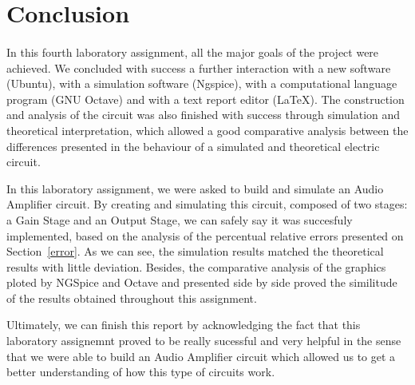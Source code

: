 \section{Conclusion}
\label{sec:conclusion}

\paragraph{}
In this fourth laboratory assignment, all the major goals of the project were achieved. We concluded with success a further interaction with a new software (Ubuntu), with a simulation software (Ngspice), with a computational language program (GNU Octave) and with a text report editor (LaTeX). The construction and analysis of the circuit was also finished with success through simulation and theoretical interpretation, which allowed a good comparative analysis between the differences presented in the behaviour of a simulated and theoretical electric circuit. 

In this laboratory assignment, we were asked to build and simulate an Audio Amplifier circuit. By creating and simulating this circuit, composed of two stages: a Gain Stage and an Output Stage, we can safely say it was succesfuly implemented, based on the analysis of the percentual relative errors presented on Section~\ref{error}. As we can see, the simulation results matched the theoretical results with little deviation. Besides, the comparative analysis of the graphics ploted by NGSpice and Octave and presented side by side proved the similitude of the results obtained throughout this assignment. 

Ultimately, we can finish this report by acknowledging the fact that this laboratory assignemnt proved to be really sucessful and very helpful in the sense that we were able to build an Audio Amplifier circuit which allowed us to get a better understanding of how this type of circuits work.


